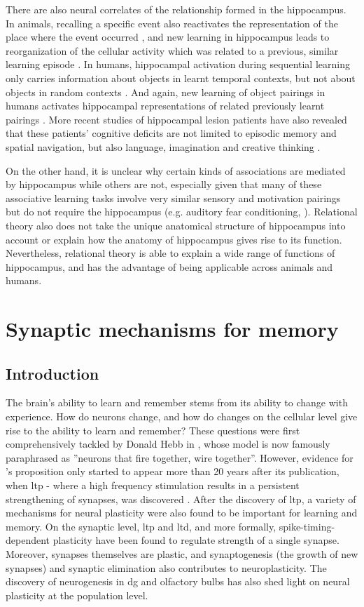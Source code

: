 There are also neural correlates of the relationship formed in the hippocampus. In animals, recalling a specific event also reactivates the representation of the place where the event occurred \citep{moita03, itskov11}, and new learning in hippocampus leads to reorganization of the cellular activity which was related to a previous, similar learning episode \citep{mckenzie13}. In humans, hippocampal activation during sequential learning only carries information about objects in learnt temporal contexts, but not about objects in random contexts \citep{hsieh14}. And again, new learning of object pairings in humans activates hippocampal representations of related previously learnt pairings \citep{zeithamova12}. More recent studies of hippocampal lesion patients have also revealed that these patients' cognitive deficits are not limited to episodic memory and spatial navigation, but also language, imagination and creative thinking \citep{duff09, duff13}.


On the other hand, it is unclear why certain kinds of associations are mediated by hippocampus while others are not, especially given that many of these associative learning tasks involve very similar sensory and motivation pairings but do not require the hippocampus (e.g. auditory fear conditioning, \citep{phillips92}). Relational theory also does not take the unique anatomical structure of hippocampus into account or explain how the anatomy of hippocampus gives rise to its function. Nevertheless, relational theory is able to explain a wide range of functions of hippocampus, and has the advantage of being applicable across animals and humans.


\section{Synaptic mechanisms for memory}
\subsection{Introduction}
The brain's ability to learn and remember stems from its ability to change with experience. How do neurons change, and how do changes on the cellular level give rise to the ability to learn and remember? These questions were first comprehensively tackled by Donald Hebb in \citeyear{hebb49}, whose model is now famously paraphrased as ''neurons that fire together, wire together''. However, evidence for \citet{hebb49}'s proposition only started to appear more than 20 years after its publication, when \gls{ltp} - where a high frequency stimulation results in a persistent strengthening of synapses, was discovered \citep{bliss73}. After the discovery of \gls{ltp}, a variety of mechanisms for neural plasticity were also found to be important for learning and memory. On the synaptic level, \gls{ltp} and \gls{ltd}, and more formally, spike-timing-dependent plasticity have been found to regulate strength of a single synapse. Moreover, synapses themselves are plastic, and synaptogenesis (the growth of new synapses) and synaptic elimination also contributes to neuroplasticity. The discovery of neurogenesis in \gls{dg} and olfactory bulbs has also shed light on neural plasticity at the population level.

